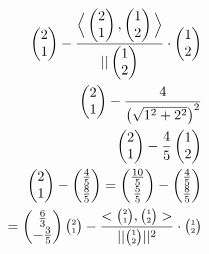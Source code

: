   \begin{align*}
    \begin{pmatrix} 2\\1 \end{pmatrix} -\frac{\Big<\begin{pmatrix} 2\\1 \end{pmatrix} , \begin{pmatrix} 1\\2 \end{pmatrix} \Big>}{| | \begin{pmatrix} 1\\2 \end{pmatrix} }\cdot \begin{pmatrix} 1\\2 \end{pmatrix} \\
    \begin{pmatrix} 2\\1 \end{pmatrix} -\frac{4}{\left(\sqrt{1^2+2^2} \right)^2 }\\
    \begin{pmatrix} 2\\1 \end{pmatrix} -\frac{4}{5}\begin{pmatrix} 1\\2 \end{pmatrix}\\ 
    \begin{pmatrix} 2\\1 \end{pmatrix} -\begin{pmatrix} \frac{4}{5}\\ \frac{8}{5} \end{pmatrix} = \begin{pmatrix} \frac{10}{5}\\\frac{5}{5} \end{pmatrix} -\begin{pmatrix} \frac{4}{5}\\\frac{8}{5} \end{pmatrix} \\
    =\begin{pmatrix} \frac{6}{3} \\ -\frac{3}{5}\end{pmatrix} 
    \SmallMatrix{2\\1}-\frac{<\SmallMatrix{2\\1}, \SmallMatrix{1\\2}>}{| | \SmallMatrix{1\\2}| | ^2}\cdot \SmallMatrix{1\\2}

\end{align*}
